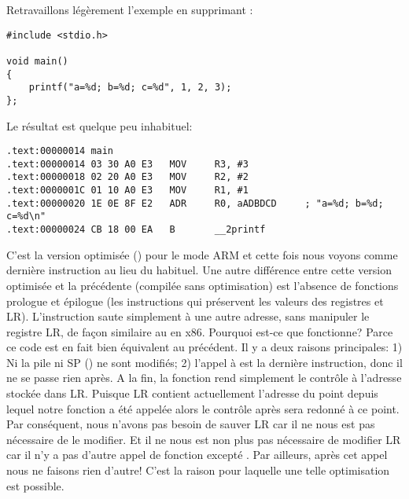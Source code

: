 \label{ARM_B_to_printf}

Retravaillons légèrement l'exemple en supprimant :

\begin{lstlisting}[style=customc]
#include <stdio.h>

void main()
{
	printf("a=%d; b=%d; c=%d", 1, 2, 3);
};
\end{lstlisting}

Le résultat est quelque peu inhabituel:

\begin{lstlisting}[caption=\OptimizingKeilVI (\ARMMode),style=customasmARM]
.text:00000014 main
.text:00000014 03 30 A0 E3   MOV     R3, #3
.text:00000018 02 20 A0 E3   MOV     R2, #2
.text:0000001C 01 10 A0 E3   MOV     R1, #1
.text:00000020 1E 0E 8F E2   ADR     R0, aADBDCD     ; "a=%d; b=%d; c=%d\n"
.text:00000024 CB 18 00 EA   B       __2printf
\end{lstlisting}

C'est la version optimisée (\Othree) pour le mode ARM et cette fois nous voyons
 comme dernière instruction au lieu du  habituel.
Une autre différence entre cette version optimisée et la précédente (compilée
sans optimisation) est l'absence de fonctions prologue et épilogue (les instructions
qui préservent les valeurs des registres  et \ac{LR}).
L'instruction  saute simplement à une autre adresse, sans manipuler le registre
\ac{LR}, de façon similaire au \JMP en x86.
Pourquoi est-ce que fonctionne? Parce ce code est en fait bien équivalent au précédent.
Il y a deux raisons principales: 1) Ni la pile ni \ac{SP} ()
ne sont modifiés;
2) l'appel à \printf est la dernière instruction, donc il ne se passe rien après.
A la fin, la fonction \printf rend simplement le contrôle à l'adresse stockée
dans \ac{LR}.
Puisque \ac{LR} contient actuellement l'adresse du point depuis lequel notre fonction
a été appelée alors le contrôle après \printf sera redonné à ce point.
Par conséquent, nous n'avons pas besoin de sauver \ac{LR} car il ne nous est pas
nécessaire de le modifier.
Et il ne nous est non plus pas nécessaire de modifier \ac{LR} car il n'y a pas d'autre
appel de fonction excepté \printf. Par ailleurs, après cet appel nous ne faisons
rien d'autre!
C'est la raison pour laquelle une telle optimisation est possible.

